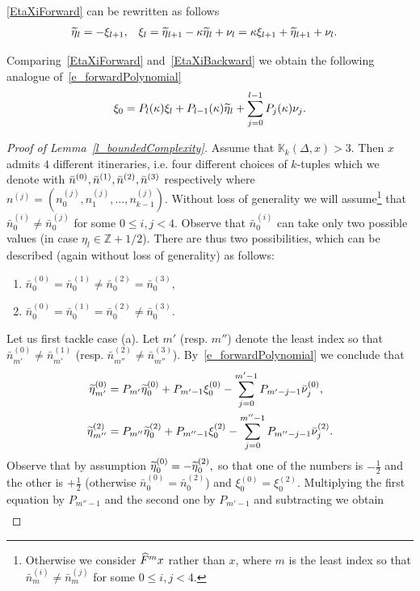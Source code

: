 \documentclass[AHL, Unicode, longabstracts,published]{cedram}
\newcommand{\bZ}{\mathbb{Z}}
\newcommand{\LC}{\mathbb{K}}
\newcommand{\nf}{\hat F}
\newcommand{\dn}{\nu}
\newcommand{\indexItinPrivate}[1]{^{(#1)}}
\newcommand{\dnt}[1]{\bar\nu\indexItinPrivate{#1}}
\newcommand{\nt}[1]{\bar n\indexItinPrivate{#1}}
\newcommand{\xit}[1]{\xi\indexItinPrivate{#1}}
\newcommand{\teta}{\tilde\eta}
\newcommand{\tetat}[1]{\teta\indexItinPrivate{#1}}
\newcommand*\DS{\displaystyle}
\newcommand*{\relabel}{\renewcommand{\labelenumi}{(\theenumi)}}
\newcommand*{\alphenumi}{\renewcommand*{\theenumi}{\alph{enumi}}\relabel}
\let\oldtilde\tilde
\renewcommand*{\tilde}[1]{\mathchoice{\widetilde{#1}}{\widetilde{#1}}{\oldtilde{#1}}{\oldtilde{#1}}}
\let\oldhat\hat
\renewcommand*{\hat}[1]{\mathchoice{\widehat{#1}}{\widehat{#1}}{\oldhat{#1}}{\oldhat{#1}}}
\begin{document}
\eqref{EtaXiForward} can be rewritten as follows
\begin{align}\label{EtaXiBackward}
\teta_l&=- \xi_{l+1}, &
\xi_{l}&= \teta_{l+1}-\kappa\teta_l +\dn_l=\kappa\xi_{l+1} +\teta_{l+1}+\dn_l.
\end{align}


Comparing~\eqref{EtaXiForward} and~\eqref{EtaXiBackward} we obtain the following analogue of~\eqref{e_forwardPolynomial}
\begin{align}\label{e_backwardPolynomial}
\xi_0 = P_l(\kappa)\xi_l+P_{l-1}(\kappa)\teta_{l}+\sum_{j = 0}^{l-1}P_j(\kappa)\dn_j.
\end{align}
\begin{proof}[Proof of Lemma~\ref{l_boundedComplexity}]
Assume that $\LC_k(\Delta,x) > 3$. Then $x$ admits $4$ different itineraries, i.e. four different choices of $k$-tuples which we denote with $\nt0,\nt1,\nt2,\linebreak\nt3$ respectively where $\DS n^{(j)}=(n^{(j)}_0, n^{(j)}_1, \dots, n^{(j)}_{k-1}).$ Without loss of generality we will assume\footnote{Otherwise we consider $\nf^mx$ rather than $x$, where $m$ is the least index so that $\nt{i}_m\ne\nt{j}_m$ for some $0 \le i,j < 4$.} that $\nt{i}_0\ne\nt{j}_0$ for some $0 \le i,j < 4$. Observe that $\nt{i}_0$ can take only two possible values (in case $\eta_l\in\bZ+1/2$). There are thus two possibilities, which can be described (again without loss of generality) as follows:
\begin{enumerate}\alphenumi
\item $\nt0_0 = \nt1_0 \ne \nt2_0 = \nt3_0,$
\item $\nt0_0 = \nt1_0 = \nt2_0 \ne \nt3_0.$
\end{enumerate}
Let us first tackle case (a). Let $m'$ (resp. $m''$) denote the least index so that $\nt0_{m'}\ne\nt1_{m'}$ (resp. $\nt2_{m''}\ne\nt3_{m''}$). By~\eqref{e_forwardPolynomial} we conclude that
\begin{align*}
\tetat0_{m'} &= P_{m'}\tetat0_0+P_{m'-1}\xit0_0-\sum_{j = 0}^{m'-1}P_{m'-j-1}\dnt0_j,\\
\tetat2_{m''} &= P_{m''}\tetat2_0+P_{m''-1}\xit2_0-\sum_{j = 0}^{m''-1}P_{m''-j-1}\dnt2_j.
\end{align*}
Observe that by assumption $\tetat0_0 = -\tetat2_0,$ so that one of the numbers is $-\frac{1}{2}$ and the other is $+\frac{1}{2}$ (otherwise $\nt0_0 = \nt 2_0$) and $\xit0_0 = \xit2_0$. Multiplying the first equation by $P_{m''-1}$ and the second one by $P_{m'-1}$ and subtracting we obtain
\begin{align*}

\end{align*}
\end{proof}
\end{document}
